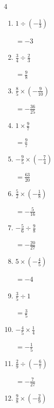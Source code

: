 \begin{multicols}{4}
\begin{enumerate}
        $\displaystyle =-2$

  \item $\displaystyle 1\div{}\left(-\frac{1}{3}\right)$

        $\displaystyle =-3$

  \item $\displaystyle \frac{3}{4}\div{}\frac{2}{3}$

        $\displaystyle =\frac{9}{8}$

  \item $\displaystyle \frac{8}{5}\times{}\left(-\frac{9}{10}\right)$

        $\displaystyle =-\frac{36}{25}$

\columnbreak %

  \item $\displaystyle 1\times{}\frac{9}{7}$

        $\displaystyle =\frac{9}{7}$

  \item $\displaystyle -\frac{9}{5}\times{}\left(-\frac{7}{4}\right)$

        $\displaystyle =\frac{63}{20}$

  \item $\displaystyle \frac{5}{2}\times{}\left(-\frac{1}{8}\right)$

        $\displaystyle =-\frac{5}{16}$

  \item $\displaystyle -\frac{5}{6}\div{}\frac{9}{8}$

        $\displaystyle =-\frac{20}{27}$

  \item $\displaystyle 5\times{}\left(-\frac{4}{5}\right)$

        $\displaystyle =-4$

  \item $\displaystyle \frac{3}{5}\div{}1$

        $\displaystyle =\frac{3}{5}$

  \item $\displaystyle -\frac{4}{5}\times{}\frac{1}{4}$

        $\displaystyle =-\frac{1}{5}$

  \item $\displaystyle \frac{2}{9}\div{}\left(-\frac{6}{7}\right)$

        $\displaystyle =-\frac{7}{27}$

  \item $\displaystyle \frac{9}{8}\times{}\left(-\frac{2}{9}\right)$


\end{enumerate}
\end{multicols}
